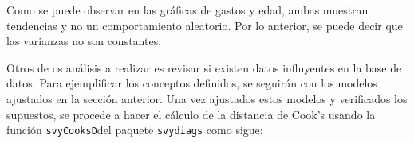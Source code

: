 \documentclass[
  12pt,
]{book}
\newenvironment{Shaded}{\begin{snugshade}}{\end{snugshade}}
\newcommand{\AttributeTok}[1]{\textcolor[rgb]{0.13,0.29,0.53}{#1}}
\newcommand{\DecValTok}[1]{\textcolor[rgb]{0.00,0.00,0.81}{#1}}
\newcommand{\FunctionTok}[1]{\textcolor[rgb]{0.13,0.29,0.53}{\textbf{#1}}}
\newcommand{\NormalTok}[1]{#1}
\newcommand{\OtherTok}[1]{\textcolor[rgb]{0.56,0.35,0.01}{#1}}
\newcommand{\SpecialCharTok}[1]{\textcolor[rgb]{0.81,0.36,0.00}{\textbf{#1}}}
\begin{document}
\begin{Shaded}
\end{Shaded}

Como se puede observar en las gráficas de gastos y edad, ambas muestran tendencias y no un comportamiento aleatorio. Por lo anterior, se puede decir que las varianzas no son constantes.

Otros de os análisis a realizar es revisar si existen datos influyentes en la base de datos. Para ejemplificar los conceptos definidos, se seguirán con los modelos ajustados en la sección anterior. Una vez ajustados estos modelos y verificados los supuestos, se procede a hacer el cálculo de la distancia de Cook's usando la función \texttt{svyCooksD}del paquete \texttt{svydiags} como sigue:

\begin{Shaded}
\end{Shaded}
\end{document}
